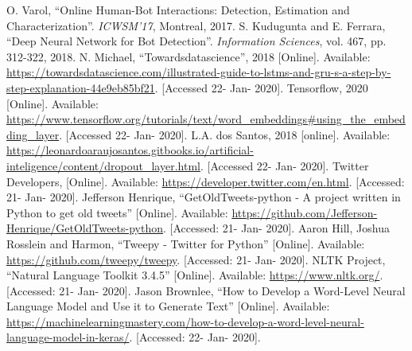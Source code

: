 \documentclass[conference]{IEEEtran}
\begin{document}
\begin{thebibliography}{00}
 O. Varol, ``Online Human-Bot Interactions: Detection, Estimation and Characterization''. \textit{ICWSM'17}, Montreal, 2017.
 S. Kudugunta and E. Ferrara, ``Deep Neural Network for Bot Detection''. \textit{Information Sciences}, vol. 467, pp. 312-322, 2018.
 N. Michael, ``Towardsdatascience'', 2018 [Online]. Available: \url{https://towardsdatascience.com/illustrated-guide-to-lstms-and-gru-s-a-step-by-step-explanation-44e9eb85bf21}. [Accessed 22- Jan- 2020].
 Tensorflow, 2020 [Online]. Available: \url{https://www.tensorflow.org/tutorials/text/word_embeddings#using_the_embedding_layer}. [Accessed 22- Jan- 2020].
 L.A. dos Santos, 2018 [online]. Available: \url{https://leonardoaraujosantos.gitbooks.io/artificial-inteligence/content/dropout_layer.html}. [Accessed 22- Jan- 2020].
 Twitter Developers, [Online]. Available: \url{https://developer.twitter.com/en.html}. [Accessed: 21- Jan- 2020].
 Jefferson Henrique, ``GetOldTweets-python - A project written in Python to get old tweets'' [Online]. Available: \url{https://github.com/Jefferson-Henrique/GetOldTweets-python}. [Accessed: 21- Jan- 2020].
 Aaron Hill, Joshua Rosslein and Harmon, ``Tweepy - Twitter for Python'' [Online]. Available: \url{https://github.com/tweepy/tweepy}. [Accessed: 21- Jan- 2020].
 NLTK Project, ``Natural Language Toolkit 3.4.5'' [Online]. Available: \url{https://www.nltk.org/}. [Accessed: 21- Jan- 2020].
 Jason Brownlee, ``How to Develop a Word-Level Neural Language Model and Use it to Generate Text'' [Online]. Available: \url{https://machinelearningmastery.com/how-to-develop-a-word-level-neural-language-model-in-keras/}. [Accessed: 22- Jan- 2020].
\end{thebibliography}
\end{document}
